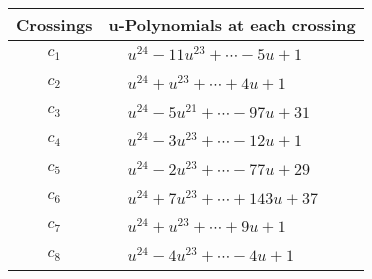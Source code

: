 \documentclass[1p]{elsarticle_modified}
\theoremstyle{definition}
\begin{document}
\begin{tabular}{m{50pt}|m{274pt}}
Crossings & \hspace{64pt}u-Polynomials at each crossing \\
\hline $$\begin{aligned}c_{1}\end{aligned}$$&$\begin{aligned}
&u^{24}-11 u^{23}+\cdots-5 u+1
\end{aligned}$\\
\hline $$\begin{aligned}c_{2}\end{aligned}$$&$\begin{aligned}
&u^{24}+u^{23}+\cdots+4 u+1
\end{aligned}$\\
\hline $$\begin{aligned}c_{3}\end{aligned}$$&$\begin{aligned}
&u^{24}-5 u^{21}+\cdots-97 u+31
\end{aligned}$\\
\hline $$\begin{aligned}c_{4}\end{aligned}$$&$\begin{aligned}
&u^{24}-3 u^{23}+\cdots-12 u+1
\end{aligned}$\\
\hline $$\begin{aligned}c_{5}\end{aligned}$$&$\begin{aligned}
&u^{24}-2 u^{23}+\cdots-77 u+29
\end{aligned}$\\
\hline $$\begin{aligned}c_{6}\end{aligned}$$&$\begin{aligned}
&u^{24}+7 u^{23}+\cdots+143 u+37
\end{aligned}$\\
\hline $$\begin{aligned}c_{7}\end{aligned}$$&$\begin{aligned}
&u^{24}+u^{23}+\cdots+9 u+1
\end{aligned}$\\
\hline $$\begin{aligned}c_{8}\end{aligned}$$&$\begin{aligned}
&u^{24}-4 u^{23}+\cdots-4 u+1
\end{aligned}$\\

\end{tabular}
\end{document}
